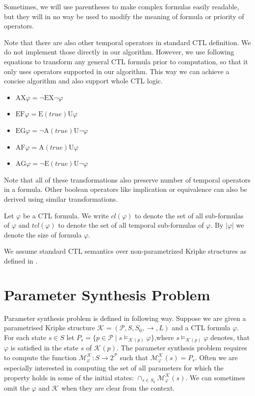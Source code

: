 \documentclass[12pt,oneside, draft]{fithesis2}
\newcommand{\ks}[1][]{\ensuremath{\mathcal{K}_{#1}}}
\newcommand{\fullKs}{\ensuremath{ \ks = (\params, S, S_0, \trans{}, L) }}
\newcommand{\trans}[1]{\stackrel{#1}{\rightarrow}}
\newcommand{\params}{\mathcal{P}}
\newcommand{\eu}[2]{\ensuremath{\mbox{E} #1 \mbox{U} #2 }}
\newcommand{\au}[2]{\ensuremath{\mbox{A} #1 \mbox{U} #2 }}
\newcommand{\ex}[1]{\ensuremath{\mbox{EX} #1}}
\newcommand{\ax}[1]{\ensuremath{\mbox{AX} #1}}
\newcommand{\ef}[1]{\ensuremath{\mbox{EF} #1}}
\newcommand{\af}[1]{\ensuremath{\mbox{AF} #1}}
\newcommand{\eg}[1]{\ensuremath{\mbox{EG} #1}}
\newcommand{\ag}[1]{\ensuremath{\mbox{AG} #1}}
\begin{document}
			Sometimes, we will use parentheses to make complex formulas easily readable, but they will in no way be used to modify the meaning of formula or priority of operators.
			
			Note	 that there are also other temporal operators in standard CTL definition. We do not implement those directly in our algorithm. However, we use following equations to transform any general CTL formula prior to computation, so that it only uses operators supported in our algorithm. This way we can achieve a concise algorithm and also support whole CTL logic.
			
			\begin{itemize}
				\item $ \ax{\varphi} = \neg \ex{ \neg \varphi } $
				\item $ \ef{\varphi} = \eu{(true)}{\varphi} $
				\item $ \eg{\varphi} = \neg \au{(true)}{\neg \varphi} $
				\item $ \af{\varphi} = \au{(true)}{\varphi} $
				\item $ \ag{\varphi} = \neg \eu{(true)}{\neg \varphi}$
			\end{itemize}
			
			Note that all of these transformations also preserve number of temporal operators in a formula. Other boolean operators like implication or equivalence can also be derived using similar transformations. 			
			
			Let $\varphi$ be a CTL formula. We write $cl(\varphi)$ to denote the set of all sub-formulas of $\varphi$ and $tcl(\varphi)$ to denote the set of all temporal sub-formulas of $\varphi$. By $|\varphi|$ we denote the size of formula $\varphi$.
			
			We assume standard CTL semantics over non-parametrized Kripke structures as defined in \cite{clarke}.

		\section{Parameter Synthesis Problem}
			
			Parameter synthesis problem is defined in following way. Suppose we are given a parametrised Kripke structure $\fullKs$ and a CTL formula $\varphi$. For each state $s \in S$ let $ P_s = \{ p \in \params \mid s \models_{\ks(p)} \varphi \} $,where $s \models_{\ks(p)} \varphi$ denotes, that $\varphi$ is satisfied in the state $s$ of $\ks(p)$. The parameter synthesis problem requires to compute the function $\mathcal{M}_{\varphi}^{\ks} : S \rightarrow 2^\params $ such that $\mathcal{M}_{\varphi}^{\ks}(s) = P_s$. Often we are especially interested in computing the set of all parameters for which the property holds in some of the initial states: $\cap_{s\in S_0}\mathcal{M}_\varphi^{\mathcal K}(s)$. We can sometimes omit the $\varphi$ and $\ks$ when they are clear from the context.	
				
\end{document}
